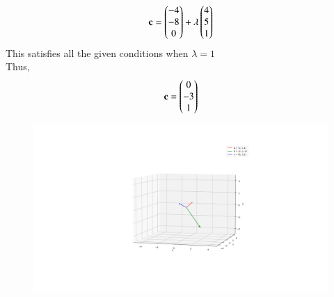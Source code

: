 \documentclass[journal]{IEEEtran}
\begin{document}
\begin{align}
    \mathbf{c}=\begin{pmatrix}-4 \\ -8 \\ 0\end{pmatrix}+\lambda\begin{pmatrix}4 \\ 5 \\ 1\end{pmatrix} \\ 
\end{align}
This satisfies all the given conditions when $\lambda=1$ \\ Thus,
\begin{align}
    \mathbf{c}=\begin{pmatrix}0 \\ -3 \\ 1\end{pmatrix}
\end{align}


\begin{figure}[H]
    \centering
    \includegraphics[width=1\columnwidth]{figs/plot4.png}
    \caption{}
    \label{fig:placeholder}
\end{figure}
\end{document}
